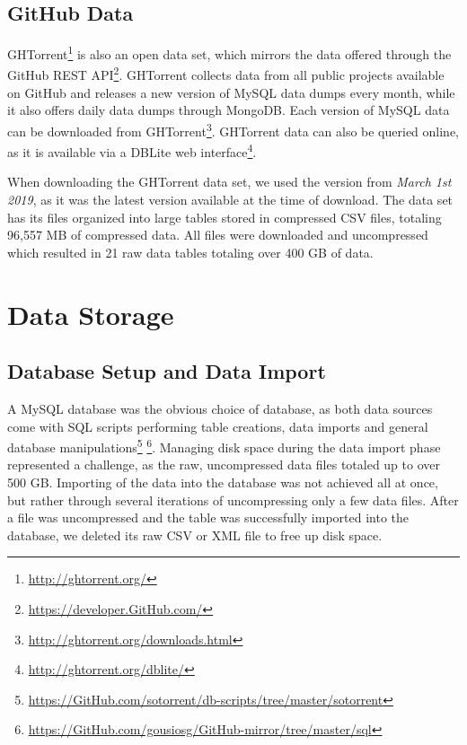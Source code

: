     \subsection{GitHub Data}
    
        GHTorrent\footnote{\label{GHTOrrent}\url{http://ghtorrent.org/}} is also an open data set, which mirrors the data offered through the GitHub REST API\footnote{\url{https://developer.GitHub.com/}}. GHTorrent collects data from all public projects available on GitHub and releases a new version of MySQL data dumps every month, while it also offers daily data dumps through MongoDB. Each version of MySQL data can be downloaded from GHTorrent\footnote{\label{GH_dowload}\url{http://ghtorrent.org/downloads.html}}. GHTorrent data can also be queried online, as it is available via a DBLite web interface\footnote{\label{GH_query}\url{http://ghtorrent.org/dblite/}}. 
            
        When downloading the GHTorrent data set, we used the version from \textit{March 1st 2019}, as it was the latest version available at the time of download. The data set has its files organized into large tables stored in compressed CSV files, totaling 96,557  MB of compressed data. All files were downloaded and uncompressed which resulted in 21 raw data tables totaling over 400 GB of data.

\section{Data Storage} \label{sec:data_storage}

    \subsection{Database Setup and Data Import}
        
        A MySQL database was the obvious choice of database, as both data sources come with SQL scripts performing table creations, data imports and general database manipulations\footnote{\label{SO_sql} \url{https://GitHub.com/sotorrent/db-scripts/tree/master/sotorrent}} \footnote{\label{GH_sql} \url{https://GitHub.com/gousiosg/GitHub-mirror/tree/master/sql}}. Managing disk space during the data import phase represented a challenge, as the raw, uncompressed data files totaled up to over 500 GB. Importing of the data into the database was not achieved all at once, but rather through several iterations of uncompressing only a few data files. After a file was uncompressed and the table was successfully imported into the database, we deleted its raw CSV or XML file to free up disk space. 
        
